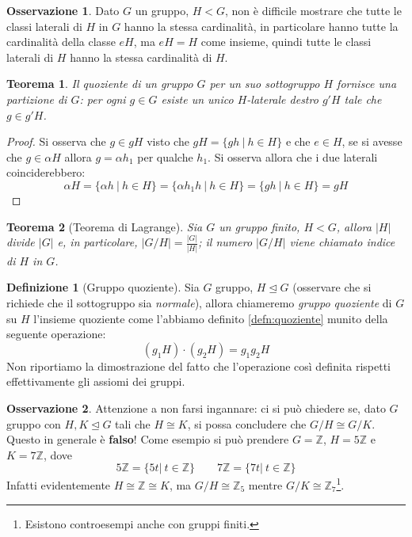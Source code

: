 \documentclass[11pt]{article}
\theoremstyle{plain}
\newtheorem{thm}{Teorema}[section]
\theoremstyle{definition}
\newtheorem{defn}{Definizione}[section]
\newtheorem*{rem}{Osservazione}
\theoremstyle{remark}
\newcommand{\Z}{\mathbb{Z}}
\begin{document}
\begin{rem}
	Dato $G$ un gruppo, $H<G$, non è difficile mostrare che tutte le classi laterali di $H$ in $G$ hanno la stessa cardinalità, in particolare hanno tutte la cardinalità della classe $eH$, ma $eH=H$ come insieme, quindi tutte le classi laterali di $H$ hanno la stessa cardinalità di $H$.
\end{rem}


\begin{thm}
	Il quoziente di un gruppo $G$ per un suo sottogruppo $H$ fornisce una partizione di $G$: per ogni $g\in G$ esiste un unico $H$-laterale destro $g'H$ tale che $g\in g'H$.
\end{thm}
\begin{proof}
	Si osserva che $g\in gH$ visto che $gH=\{gh\ |\ h\in H\}$ e che $e\in H$, se si avesse che $g\in \alpha H$ allora $g=\alpha h_1$ per qualche $h_1$. Si osserva allora che i due laterali coinciderebbero:
	\[
		\alpha H=\{ \alpha h\ |\ h\in H\} = \{ \alpha h_1 h\ |\ h\in H \} = \{ gh\ |\ h\in H\} = gH
	\]
\end{proof}

\begin{thm}[Teorema di Lagrange]
	Sia $G$ un gruppo finito, $H<G$, allora $|H|$ divide $|G|$ e, in particolare, $\displaystyle |G/H|=\frac{|G|}{|H|}$; il numero $|G/H|$ viene chiamato \textit{indice} di $H$ in $G$.
\end{thm}


\begin{defn}[Gruppo quoziente]
	Sia $G$ gruppo, $H\trianglelefteq G$ (osservare che si richiede che il sottogruppo sia \textit{normale}), allora chiameremo \textit{gruppo quoziente} di $G$ su $H$ l'insieme quoziente come l'abbiamo definito \eqref{defn:quoziente} munito della seguente operazione:
	\[
		(g_1H)\cdot(g_2H)=g_1g_2H
	\]
	Non riportiamo la dimostrazione del fatto che l'operazione così definita rispetti effettivamente gli assiomi dei gruppi.
\end{defn}

\begin{rem}
	Attenzione a non farsi ingannare: ci si può chiedere se, dato $G$ gruppo con $H,K\trianglelefteq G$ tali che $H\cong K$, si possa concludere che $G/H\cong G/K$. Questo in generale è \textbf{falso}! Come esempio si può prendere $G=\Z$, $H=5\Z$ e $K=7\Z$, dove
	\[
		5\Z=\{ 5t|\ t\in \Z\}\qquad 7\Z=\{ 7t|\ t\in \Z\}
	\]
	Infatti evidentemente $H\cong \Z\cong K$, ma $G/H\cong \Z_5$ mentre $G/K\cong \Z_7$\footnote{Esistono controesempi anche con gruppi finiti.}.
\end{rem}
\end{document}
